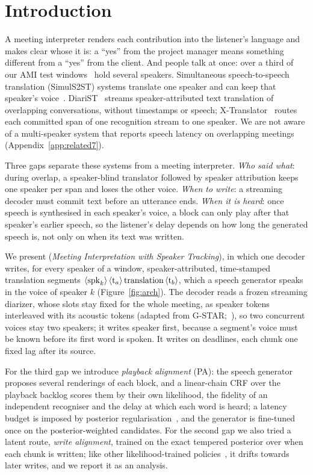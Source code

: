 \section{Introduction}
\label{sec:intro}

A meeting interpreter renders each contribution into the listener's language and makes clear whose it is: a
``yes'' from the project manager means something different from a ``yes'' from the client. And people talk at once:
over a third of our AMI test windows~\citep{carletta2005ami} hold several speakers. Simultaneous speech-to-speech
translation (SimulS2ST) systems translate one speaker and can keep that speaker's
voice~\citep{seamless2023,labiausse2025hibiki,cheng2025liveinterpret,deng2025simuls2s}. DiariST~\citep{yang2024diarist}
streams speaker-attributed text translation of overlapping conversations, without timestamps or speech;
X-Translator~\citep{zhao2026xtranslator} routes each committed span of one recognition stream to one speaker. We are not
aware of a multi-speaker system that reports speech latency on overlapping meetings (Appendix~\ref{app:related7}).

Three gaps separate these systems from a meeting interpreter. \emph{Who said what}: during overlap, a speaker-blind
translator followed by speaker attribution keeps one speaker per span and loses the other voice. \emph{When to write}:
a streaming decoder must commit text before an utterance ends. \emph{When it is heard}: once speech is synthesised in
each speaker's voice, a block can only play after that speaker's earlier speech, so the listener's delay depends on
how long the generated speech is, not only on when its text was written.

We present \sys{} (\emph{Meeting Interpretation with Speaker Tracking}), in which one decoder writes, for every speaker
of a window, speaker-attributed, time-stamped translation segments $\langle\mathrm{spk}_{k}\rangle\,\langle\mathrm{t}_{a}\rangle\,\text{translation}\,\langle\mathrm{t}_{b}\rangle$,
which a speech generator speaks in the voice of speaker $k$ (Figure~\ref{fig:arch}). The decoder reads a frozen
streaming diarizer, whose slots stay fixed for the whole meeting, as speaker tokens interleaved with its acoustic tokens
(adapted from G-STAR;~\citealp{peng2026gstar}), so two concurrent voices stay two speakers; it writes speaker first,
because a segment's voice must be known before its first word is spoken. It writes on deadlines, each chunk one fixed
lag after its source.

For the third gap we introduce \emph{playback alignment} (PA): the speech generator proposes several renderings of each
block, and a linear-chain CRF over the playback backlog scores them by their own likelihood, the fidelity of an
independent recogniser and the delay at which each word is heard; a latency budget is imposed by posterior
regularisation~\citep{ganchev2010posterior}, and the
generator is fine-tuned once on the posterior-weighted candidates. For the second gap we also tried a latent route,
\emph{write alignment}, trained on the exact tempered posterior over when each chunk is written; like other
likelihood-trained policies~\citep{arivazhagan2019milk,ma2020mma}, it drifts towards later writes, and we report it as
an analysis.

